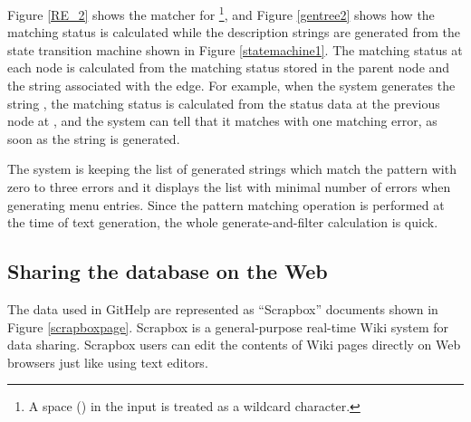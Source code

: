 \documentclass{sigchi}
\def\GH{\textsf{GitHelp}}
\def\SB{\textsf{Scrapbox}}
\begin{document}
Figure \ref{RE_2} shows the matcher for \footnote{
  A space (\qtt{ }) in the input is treated as a wildcard character.
},
and Figure \ref{gentree2} shows how the matching status is calculated while the
description strings are generated from the state transition machine
shown in Figure \ref{statemachine1}.
The matching status at each node is calculated from the matching status
stored in the parent node and the string associated with the edge.
For example, when the system generates the string
,
the matching status is calculated from the status data at the previous node at
, and
the system can tell that it matches  with one matching error,
as soon as the string is generated.

The system is keeping the list of generated strings
which match the pattern with zero to three errors
and it displays the list with minimal number of errors
when generating menu entries.
% 
Since the pattern matching operation is performed at the time of text generation,
the whole generate-and-filter calculation is quick.



\subsection{Sharing the database on the Web}

The data used in {\GH} are represented as ``{\SB}'' documents
shown in Figure \ref{scrapboxpage}.
%
{\SB} is a general-purpose real-time Wiki system for data sharing.
{\SB} users can edit the contents of Wiki pages directly
on Web browsers just like using text editors.

\end{document}
